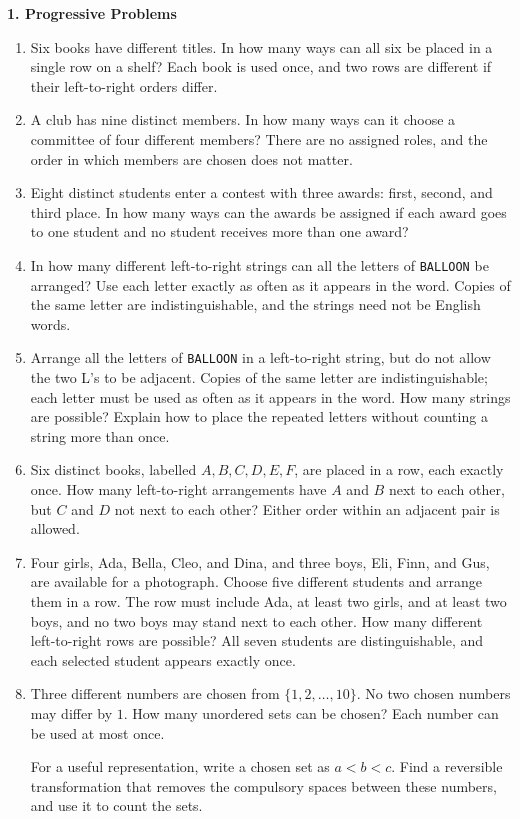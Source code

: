 \documentclass[11pt]{article}
\newcommand{\stageheading}[1]{%
  \par\Needspace{6\baselineskip}%
  \addvspace{.65\baselineskip}%
  {\centering\large\bfseries #1\par}%
  \nopagebreak[4]}
\begin{document}
\stageheading{1. Progressive Problems}

\begin{enumerate}[label=\textbf{\arabic*.}]
\item Six books have different titles. In how many ways can all six be
placed in a single row on a shelf? Each book is used once, and two rows
are different if their left-to-right orders differ.

\item A club has nine distinct members. In how many ways can it choose
a committee of four different members? There are no assigned roles, and
the order in which members are chosen does not matter.

\item Eight distinct students enter a contest with three awards: first,
second, and third place. In how many ways can the awards be assigned if
each award goes to one student and no student receives more than one award?

\item In how many different left-to-right strings can all the letters of
\texttt{BALLOON} be arranged? Use each letter exactly as often as it appears
in the word. Copies of the same letter are indistinguishable, and the
strings need not be English words.

\item Arrange all the letters of \texttt{BALLOON} in a left-to-right
string, but do not allow the two L's to be adjacent. Copies of the same
letter are indistinguishable; each letter must be used as often as it
appears in the word. How many strings are possible? Explain how to place
the repeated letters without counting a string more than once.

\item Six distinct books, labelled $A,B,C,D,E,F$, are placed in a row,
each exactly once. How many left-to-right arrangements have $A$ and $B$
next to each other, but $C$ and $D$ not next to each other? Either order
within an adjacent pair is allowed.

\item Four girls, Ada, Bella, Cleo, and Dina, and three boys, Eli, Finn,
and Gus, are available for a photograph. Choose five different students
and arrange them in a row. The row must include Ada, at least two girls,
and at least two boys, and no two boys may stand next to each other.
How many different left-to-right rows are possible? All seven students
are distinguishable, and each selected student appears exactly once.
\item Three different numbers are chosen from $\{1,2,\ldots,10\}$.
No two chosen numbers may differ by $1$. How many unordered sets can be
chosen? Each number can be used at most once.

For a useful representation, write a chosen set as $a<b<c$.
Find a reversible transformation that removes the compulsory spaces
between these numbers, and use it to count the sets.
\end{enumerate}
\end{document}
